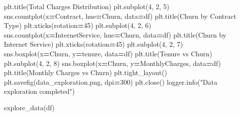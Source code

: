 \documentclass[preprint, 3p,
authoryear]{elsarticle} %
\newenvironment{Shaded}{\begin{snugshade}}{\end{snugshade}}
\newcommand{\DecValTok}[1]{\textcolor[rgb]{0.00,0.00,0.81}{#1}}
\newcommand{\NormalTok}[1]{#1}
\newcommand{\OperatorTok}[1]{\textcolor[rgb]{0.81,0.36,0.00}{\textbf{#1}}}
\newcommand{\StringTok}[1]{\textcolor[rgb]{0.31,0.60,0.02}{#1}}
\begin{document}
\begin{Shaded}
\begin{Highlighting}[]
\NormalTok{    plt.title(}\StringTok{\textquotesingle{}Total Charges Distribution\textquotesingle{}}\NormalTok{)}
\NormalTok{    plt.subplot(}\DecValTok{4}\NormalTok{, }\DecValTok{2}\NormalTok{, }\DecValTok{5}\NormalTok{)}
\NormalTok{    sns.countplot(x}\OperatorTok{=}\StringTok{\textquotesingle{}Contract\textquotesingle{}}\NormalTok{, hue}\OperatorTok{=}\StringTok{\textquotesingle{}Churn\textquotesingle{}}\NormalTok{, data}\OperatorTok{=}\NormalTok{df)}
\NormalTok{    plt.title(}\StringTok{\textquotesingle{}Churn by Contract Type\textquotesingle{}}\NormalTok{)}
\NormalTok{    plt.xticks(rotation}\OperatorTok{=}\DecValTok{45}\NormalTok{)}
\NormalTok{    plt.subplot(}\DecValTok{4}\NormalTok{, }\DecValTok{2}\NormalTok{, }\DecValTok{6}\NormalTok{)}
\NormalTok{    sns.countplot(x}\OperatorTok{=}\StringTok{\textquotesingle{}InternetService\textquotesingle{}}\NormalTok{, hue}\OperatorTok{=}\StringTok{\textquotesingle{}Churn\textquotesingle{}}\NormalTok{, data}\OperatorTok{=}\NormalTok{df)}
\NormalTok{    plt.title(}\StringTok{\textquotesingle{}Churn by Internet Service\textquotesingle{}}\NormalTok{)}
\NormalTok{    plt.xticks(rotation}\OperatorTok{=}\DecValTok{45}\NormalTok{)}
\NormalTok{    plt.subplot(}\DecValTok{4}\NormalTok{, }\DecValTok{2}\NormalTok{, }\DecValTok{7}\NormalTok{)}
\NormalTok{    sns.boxplot(x}\OperatorTok{=}\StringTok{\textquotesingle{}Churn\textquotesingle{}}\NormalTok{, y}\OperatorTok{=}\StringTok{\textquotesingle{}tenure\textquotesingle{}}\NormalTok{, data}\OperatorTok{=}\NormalTok{df)}
\NormalTok{    plt.title(}\StringTok{\textquotesingle{}Tenure vs Churn\textquotesingle{}}\NormalTok{)}
\NormalTok{    plt.subplot(}\DecValTok{4}\NormalTok{, }\DecValTok{2}\NormalTok{, }\DecValTok{8}\NormalTok{)}
\NormalTok{    sns.boxplot(x}\OperatorTok{=}\StringTok{\textquotesingle{}Churn\textquotesingle{}}\NormalTok{, y}\OperatorTok{=}\StringTok{\textquotesingle{}MonthlyCharges\textquotesingle{}}\NormalTok{, data}\OperatorTok{=}\NormalTok{df)}
\NormalTok{    plt.title(}\StringTok{\textquotesingle{}Monthly Charges vs Churn\textquotesingle{}}\NormalTok{)}
\NormalTok{    plt.tight\_layout()}
\NormalTok{    plt.savefig(}\StringTok{\textquotesingle{}data\_exploration.png\textquotesingle{}}\NormalTok{, dpi}\OperatorTok{=}\DecValTok{300}\NormalTok{)}
\NormalTok{    plt.close()}
\NormalTok{    logger.info(}\StringTok{"Data exploration completed"}\NormalTok{)}

\NormalTok{explore\_data(df)}
\end{Highlighting}
\end{Shaded}
\end{document}
